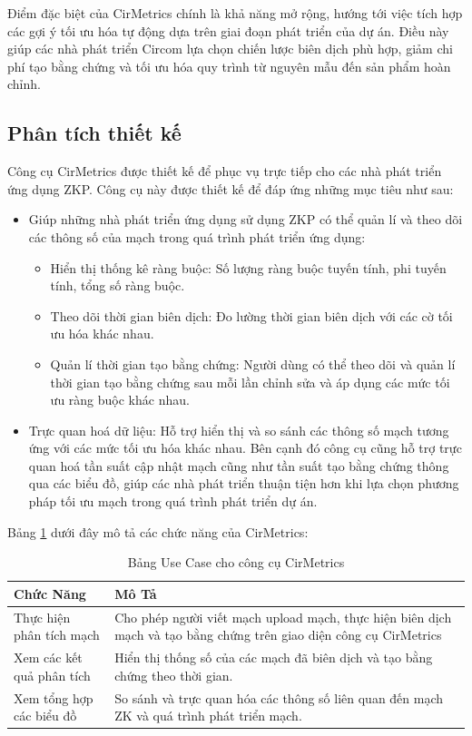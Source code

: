 Điểm đặc biệt của CirMetrics chính là khả năng mở rộng, hướng tới việc tích hợp các gợi ý tối ưu hóa tự động dựa trên giai đoạn phát triển của dự án. Điều này giúp các nhà phát triển Circom lựa chọn chiến lược biên dịch phù hợp, giảm chi phí tạo bằng chứng và tối ưu hóa quy trình từ nguyên mẫu đến sản phẩm hoàn chỉnh.
\subsection{Phân tích thiết kế}
Công cụ CirMetrics được thiết kế để phục vụ trực tiếp cho các nhà phát triển ứng dụng ZKP. Công cụ này được thiết kế để đáp ứng những mục tiêu như sau:

\begin{itemize}
    \item Giúp những nhà phát triển ứng dụng sử dụng ZKP có thể quản lí và theo dõi các thông số của mạch trong quá trình phát triển ứng dụng:
    \begin{itemize}
        \item Hiển thị thống kê ràng buộc: Số lượng ràng buộc tuyến tính, phi tuyến tính, tổng số ràng buộc.
        \item Theo dõi thời gian biên dịch: Đo lường thời gian biên dịch với các cờ tối ưu hóa khác nhau.
        \item Quản lí thời gian tạo bằng chứng: Người dùng có thể theo dõi và quản lí thời gian tạo bằng chứng sau mỗi lần chỉnh sửa và áp dụng các mức tối ưu ràng buộc khác nhau.
    \end{itemize}
    \item Trực quan hoá dữ liệu: Hỗ trợ hiển thị và so sánh các thông số mạch tương ứng với các mức tối ưu hóa khác nhau. Bên cạnh đó công cụ cũng hỗ trợ trực quan hoá tần suất cập nhật mạch cũng như tần suất tạo bằng chứng thông qua các biểu đồ, giúp các nhà phát triển thuận tiện hơn khi lựa chọn phương pháp tối ưu mạch trong quá trình phát triển dự án.
\end{itemize}

Bảng \ref{tab:use_case_cirmetrics} dưới đây mô tả các chức năng của CirMetrics:

\begin{table}[h]
    \centering
    \begin{tabular}{|l|p{7cm}|}
        \hline
        \textbf{Chức Năng} & \textbf{Mô Tả} \\ \hline
        Thực hiện phân tích mạch & Cho phép người viết mạch upload mạch, thực hiện biên dịch mạch và tạo bằng chứng trên giao diện công cụ CirMetrics\\ \hline
        Xem các kết quả phân tích & Hiển thị thống số của các mạch đã biên dịch và tạo bằng chứng theo thời gian. \\ \hline
        Xem tổng hợp các biểu đồ & So sánh và trực quan hóa các thông số liên quan đến mạch ZK và quá trình phát triển mạch.
        \\ \hline
    \end{tabular}
    \caption{Bảng Use Case cho công cụ CirMetrics}
    \label{tab:use_case_cirmetrics}
\end{table}
